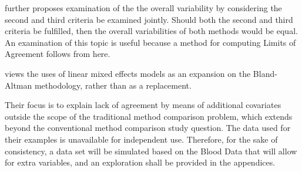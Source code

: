 \documentclass[12pt, a4paper]{report}
\theoremstyle{plain}
\theoremstyle{definition}
\theoremstyle{remark}
\begin{document}
	
	\citet{ARoy2009} further proposes examination of the the overall variability by considering the second and third criteria be examined jointly. Should both the second and third criteria be fulfilled, then the overall variabilities of both methods would be equal. An examination of this topic is useful because a method for computing Limits of Agreement follows from here.
	

\citet{LaiShiao} views
	the uses of linear mixed effects models as an expansion on the
	Bland-Altman methodology, rather than as a replacement. 
	
	 Their focus is to explain lack of agreement by means of additional covariates outside the scope of the traditional method comparison problem, which extends beyond the conventional method comparison study question. The data used for their examples is unavailable for independent use. Therefore, for the sake of consistency, a data set will be simulated based on the Blood Data that will allow for extra variables, and an exploration shall be provided in the appendices.
	

	

	
	
	
	
	
\end{document}
